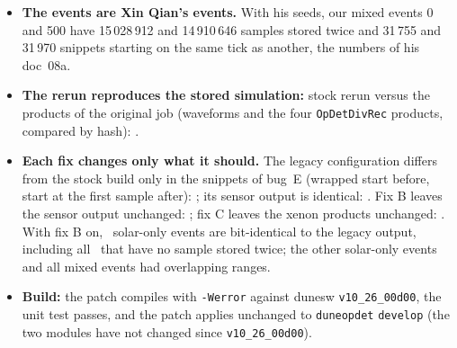 \documentclass[10pt]{article}
\newcommand{\code}[1]{\texttt{#1}}
\begin{document}
\begin{itemize}
\item \textbf{The events are Xin Qian's events.} With his seeds, our mixed events 0 and 500 have 15\,028\,912 and
  14\,910\,646 samples stored twice and 31\,755 and 31\,970 snippets starting on the same tick as another, the numbers
  of his doc~08a.
\item \textbf{The rerun reproduces the stored simulation:} stock rerun versus the products of the original job
  (waveforms and the four \code{OpDetDivRec} products, compared by hash): \numgatestockeqstored.
\item \textbf{Each fix changes only what it should.}
  The legacy configuration differs from the stock build only in the snippets of bug~E (wrapped start before, start
  at the first sample after): \numgateEonly; its sensor output is identical: \numgatelegacydiveq.
  Fix B leaves the sensor output unchanged: \numgateBdiv; fix C leaves the xenon products unchanged: \numgateCxe.
  With fix B on, \numgateBidentsol\ solar-only events are bit-identical to the legacy output, including all
  \numgateBnolapsol\ that have no sample stored twice; the other solar-only events and all mixed events had
  overlapping ranges.
\item \textbf{Build:} the patch compiles with \code{-Werror} against dunesw \code{v10\_26\_00d00}, the unit test
  passes, and the patch applies unchanged to \code{duneopdet} \code{develop} (the two modules have not changed since
  \code{v10\_26\_00d00}).
\end{itemize}

\appendix
\end{document}
